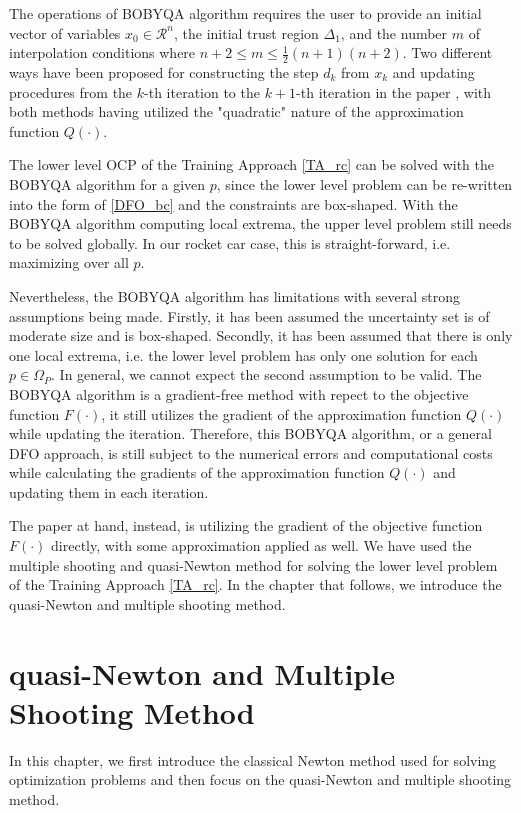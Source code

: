 \documentclass  [
  paper    = a4,
  BCOR     = 10mm,
  twoside,
  fontsize = 12pt,
  fleqn,
  toc      = bibnumbered,
  toc      = listofnumbered,
  numbers  = noendperiod,
  headings = normal,
  listof   = leveldown,
  version  = 3.03
]                                       {scrreprt}
\newcommand{\<}{\langle}
\renewcommand{\>}{\rangle}
\begin{document}
   The operations of BOBYQA algorithm requires the user to provide an initial vector of variables $x_0 \in \mathcal{R}^n$, the initial trust region $\Delta_1$, and the number $m$ of interpolation conditions where $n+2 \leq m \leq \frac{1}{2}(n+1)(n+2)$. Two different ways have been proposed for constructing the step $d_k$ from $x_k$ and updating procedures from the $k$-th iteration to the $k+1$-th iteration in the paper \cite{MicPow09}, with both methods having utilized the "quadratic" nature of the approximation function $Q(\cdot)$.
   
   The lower level OCP of the Training Approach \ref{TA_rc} can be solved with the BOBYQA algorithm for a given $p$, since the lower level problem can be re-written into the form of \ref{DFO_bc} and the constraints are box-shaped. With the BOBYQA algorithm computing local extrema, the upper level problem still needs to be solved globally. In our rocket car case, this is straight-forward, i.e. maximizing over all $p$. 
   
   Nevertheless, the BOBYQA algorithm has limitations with several strong assumptions being made. Firstly, it has been assumed the uncertainty set is of moderate size and is box-shaped. Secondly, it has been assumed that there is only one local extrema, i.e. the lower level problem has only one solution for each $p \in \Omega_P$. In general, we cannot expect the second assumption to be valid. The BOBYQA algorithm is a gradient-free method with repect to the objective function $F(\cdot)$, it still utilizes the gradient of the approximation function $Q(\cdot)$ while updating the iteration. Therefore, this BOBYQA algorithm, or a general DFO approach, is still subject to the numerical errors and computational costs while calculating the gradients of the approximation function $Q(\cdot)$  and updating them in each iteration.  
   
   The paper at hand, instead, is utilizing the gradient of the objective function $F(\cdot)$ directly, with some approximation applied as well. We have used the multiple shooting and quasi-Newton method for solving the lower level problem of the Training Approach \ref{TA_rc}. In the chapter that follows, we introduce the quasi-Newton and multiple shooting method. 
   
   
   \chapter{quasi-Newton and Multiple Shooting Method}
   In this chapter, we first introduce the classical Newton method used for solving optimization problems and then focus on the quasi-Newton and multiple shooting method. 
   
\end{document}
